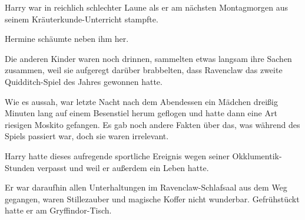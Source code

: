 \later

Harry war in reichlich schlechter Laune als er am nächsten Montagmorgen aus seinem Kräuterkunde-Unterricht stampfte.

Hermine schäumte neben ihm her.

Die anderen Kinder waren noch drinnen, sammelten etwas langsam ihre Sachen zusammen, weil sie aufgeregt darüber brabbelten, dass Ravenclaw das zweite Quidditch-Spiel des Jahres gewonnen hatte.

Wie es aussah, war letzte Nacht nach dem Abendessen ein Mädchen dreißig Minuten lang auf einem Besenstiel herum geflogen und hatte dann eine Art riesigen Moskito gefangen. Es gab noch andere Fakten über das, was während des Spiels passiert war, doch sie waren irrelevant.

Harry hatte dieses aufregende sportliche Ereignis wegen seiner Okklumentik-Stunden verpasst und weil er außerdem ein Leben hatte.

Er war daraufhin allen Unterhaltungen im Ravenclaw-Schlafsaal aus dem Weg gegangen, waren Stillezauber und magische Koffer nicht wunderbar. Gefrühstückt hatte er am Gryffindor-Tisch.

